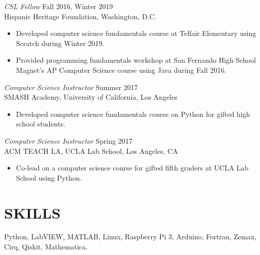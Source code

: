 \documentclass[margin,line]{res}
\let\origsection\section%
\let\section\subsection%
\let\section\origsection%
\begin{document}
\begin{resume}
{\sl CSL Fellow} \hfill        Fall 2016, Winter 2019  \\
Hispanic Heritage Foundation,   Washington, D.C.
\begin{itemize} \itemsep -2pt 
	\item Developed computer science fundamentals course at Telfair Elementary using Scratch during Winter 2019.
	\item Provided programming fundamentals workshop at San Fernando High School Magnet's AP Computer Science course using Java during Fall 2016.
\end{itemize}

 {\sl Computer Science Instructor} \hfill            Summer 2017 \\
SMASH Academy, University of California, Los Angeles
\begin{itemize}  \itemsep -2pt %
	\item Developed computer science fundamentals course on Python for gifted high school students.
\end{itemize} 

{\sl Computer Science Instructor} \hfill        Spring 2017  \\
ACM TEACH LA, UCLA Lab School,   Los Angeles, CA
\begin{itemize} \itemsep -2pt 
	\item Co-lead on a computer science course for gifted fifth graders at UCLA Lab School using Python.
\end{itemize} 


\iffalse
{\sl CSL Fellow} \hfill        Fall 2016  \\
Hispanic Heritage Foundation,   San Fernando, CA
\begin{itemize} \itemsep -2pt 
	\item Provided programming fundamentals workshop for AP Computer Science students using Java at San Fernando High School Magnet program.
\end{itemize}
\fi

\section{\mysidestyle  SKILLS}  Python, LabVIEW, MATLAB, Linux, Raspberry Pi 3, Arduino, Fortran, Zemax, Cirq, Qiskit, Mathematica.


\end{resume}
\end{document}
